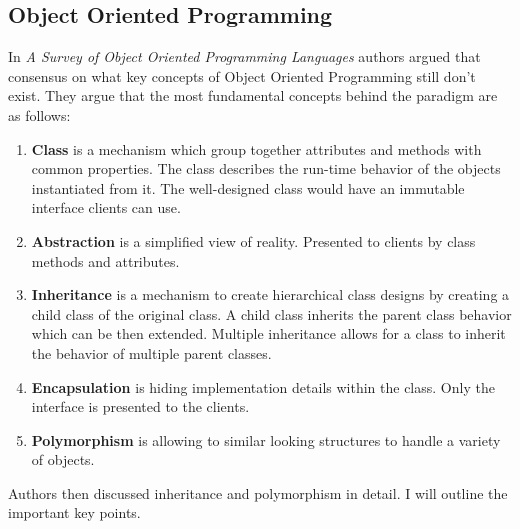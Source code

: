 \documentclass[12pt,twoside,a4paper]{report}
\begin{document}
\subsection{Object Oriented Programming}\label{2.3.1}
In \emph{A Survey of Object Oriented Programming Languages}\cite{13} authors argued that consensus on what key concepts of Object Oriented Programming still don't exist. They argue that the most fundamental concepts behind the paradigm are as follows:
\begin{enumerate}\itemsep1pt \parskip0pt 
\item \textbf{Class} is a mechanism which group together attributes and methods with common properties. The class describes the run-time behavior of the objects instantiated from it. The well-designed class would have an immutable interface clients can use.
\item \textbf{Abstraction} is a simplified view of reality. Presented to clients by class methods and attributes.
\item \textbf{Inheritance} is a mechanism to create hierarchical class designs by creating a child class of the original class. A child class inherits the parent class behavior which can be then extended. Multiple inheritance allows for a class to inherit the behavior of multiple parent classes.
\item \textbf{Encapsulation} is hiding implementation details within the class. Only the interface is presented to the
clients.
\item \textbf{Polymorphism} is allowing to similar looking structures to handle a variety of objects.
\end{enumerate}
Authors then discussed inheritance and polymorphism in detail. I will outline the important key points.
\end{document}
